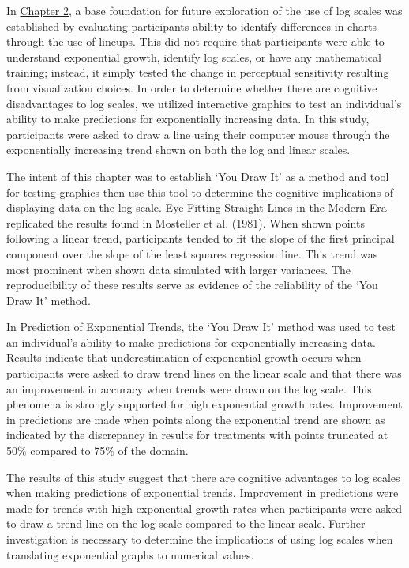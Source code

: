 \documentclass[print]{nuthesis}
\begin{document}
In \protect\hyperlink{lineups}{Chapter 2}, a base foundation for future exploration of the use of log scales was established by evaluating participants ability to identify differences in charts through the use of lineups.
This did not require that participants were able to understand exponential growth, identify log scales, or have any mathematical training; instead, it simply tested the change in perceptual sensitivity resulting from visualization choices.
In order to determine whether there are cognitive disadvantages to log scales, we utilized interactive graphics to test an individual's ability to make predictions for exponentially increasing data.
In this study, participants were asked to draw a line using their computer mouse through the exponentially increasing trend shown on both the log and linear scales.

The intent of this chapter was to establish `You Draw It' as a method and tool for testing graphics then use this tool to determine the cognitive implications of displaying data on the log scale.
Eye Fitting Straight Lines in the Modern Era replicated the results found in Mosteller et al. (1981).
When shown points following a linear trend, participants tended to fit the slope of the first principal component over the slope of the least squares regression line.
This trend was most prominent when shown data simulated with larger variances.
The reproducibility of these results serve as evidence of the reliability of the `You Draw It' method.

In Prediction of Exponential Trends, the `You Draw It' method was used to test an individual's ability to make predictions for exponentially increasing data.
Results indicate that underestimation of exponential growth occurs when participants were asked to draw trend lines on the linear scale and that there was an improvement in accuracy when trends were drawn on the log scale.
This phenomena is strongly supported for high exponential growth rates.
Improvement in predictions are made when points along the exponential trend are shown as indicated by the discrepancy in results for treatments with points truncated at 50\% compared to 75\% of the domain.

The results of this study suggest that there are cognitive advantages to log scales when making predictions of exponential trends.
Improvement in predictions were made for trends with high exponential growth rates when participants were asked to draw a trend line on the log scale compared to the linear scale.
Further investigation is necessary to determine the implications of using log scales when translating exponential graphs to numerical values.
\end{document}
